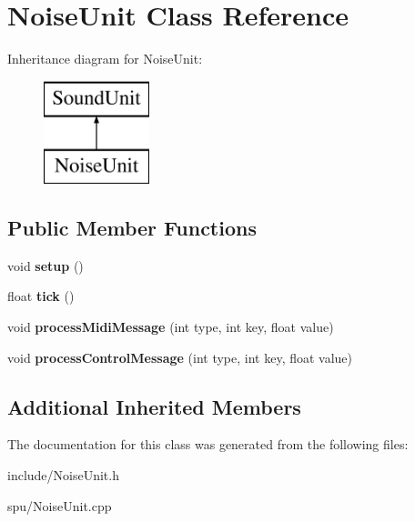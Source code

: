 \hypertarget{classNoiseUnit}{}\section{Noise\+Unit Class Reference}
\label{classNoiseUnit}
Inheritance diagram for Noise\+Unit\+:\begin{figure}[H]
\begin{center}
\leavevmode
\includegraphics[height=3.000000cm]{classNoiseUnit}
\end{center}
\end{figure}
\subsection*{Public Member Functions}
\begin{DoxyCompactItemize}
\item 
void {\bfseries setup} ()\hypertarget{classNoiseUnit_a81666e8bdea833fad6a4451a765c6b83}{}\label{classNoiseUnit_a81666e8bdea833fad6a4451a765c6b83}

\item 
float {\bfseries tick} ()\hypertarget{classNoiseUnit_af48a9a915f7f593105e8fe2d2ddb745a}{}\label{classNoiseUnit_af48a9a915f7f593105e8fe2d2ddb745a}

\item 
void {\bfseries process\+Midi\+Message} (int type, int key, float value)\hypertarget{classNoiseUnit_a58e18639dc527bb67184b38107bd6acf}{}\label{classNoiseUnit_a58e18639dc527bb67184b38107bd6acf}

\item 
void {\bfseries process\+Control\+Message} (int type, int key, float value)\hypertarget{classNoiseUnit_a755cc04254bf8ecba6082ea8d6151d6c}{}\label{classNoiseUnit_a755cc04254bf8ecba6082ea8d6151d6c}

\end{DoxyCompactItemize}
\subsection*{Additional Inherited Members}


The documentation for this class was generated from the following files\+:\begin{DoxyCompactItemize}
\item 
include/Noise\+Unit.\+h\item 
spu/Noise\+Unit.\+cpp\end{DoxyCompactItemize}
